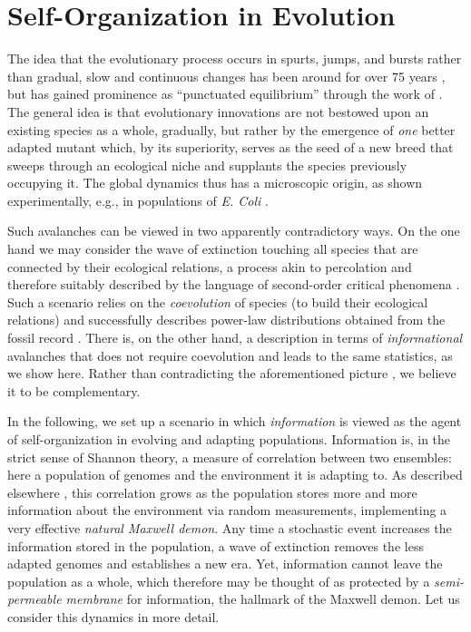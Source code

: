 \documentclass[letterpaper]{article}
\begin{document}
\section{Self-Organization in Evolution}
The idea that the evolutionary process occurs in spurts, jumps, and
bursts rather than gradual, slow and continuous changes has been
around for over 75 years \citep{WIL}, but has gained prominence as
``punctuated equilibrium'' through the work of \citet{GE77,GE93}. The
general idea is that evolutionary innovations are not bestowed upon an
existing species as a whole, gradually, but rather by the emergence of
{\em one} better adapted mutant which, by its superiority, serves as
the seed of a new breed that sweeps through an ecological niche and
supplants the species previously occupying it. The global dynamics
thus has a microscopic origin, as shown experimentally, e.g., in
populations of {\it E. Coli} \citep{ECL96}.

Such avalanches can be viewed in two apparently contradictory ways. On
the one hand we may consider the wave of extinction touching all
species that are connected by their ecological relations, a process
akin to percolation and therefore suitably described by the language
of second-order critical phenomena \citep{BS}. Such a scenario relies
on the {\em coevolution} of species (to build their ecological
relations) and successfully describes power-law distributions obtained
from the fossil record \citep{SB96,BP96}. There is, on the other hand,
a description in terms of {\em informational} avalanches that does not
require coevolution and leads to the same statistics, as we show
here. Rather than contradicting the aforementioned picture
\citep{NFST}, we believe it to be complementary.

In the following, we set up a scenario in which {\em information} is
viewed as the agent of self-organization in evolving and adapting
populations. Information is, in the strict sense of Shannon theory, a
measure of correlation between two ensembles: here a population of
genomes and the environment it is adapting to. As described elsewhere
\citep{IAL}, this correlation grows as the population stores more and
more information about the environment via random measurements,
implementing a very effective {\em natural Maxwell demon}. Any time a
stochastic event increases the information stored in the population, a
wave of extinction removes the less adapted genomes and establishes a
new era. Yet, information cannot leave the population as a whole,
which therefore may be thought of as protected by a {\em
semi-permeable membrane} for information, the hallmark of the Maxwell
demon. Let us consider this dynamics in more detail.
\end{document}
